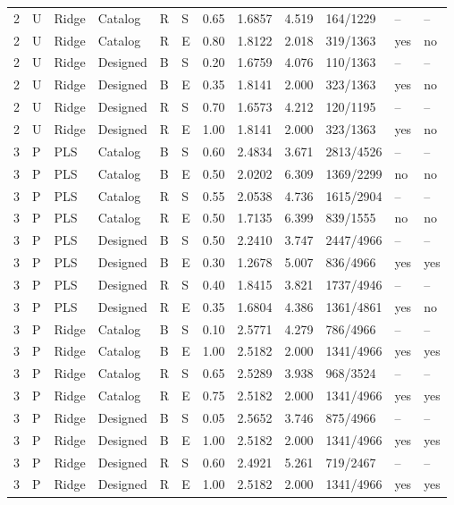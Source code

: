\documentclass[10pt,a4paper]{article}
\begin{document}
\begin{landscape}
\begin{longtable}{rlllllrrrlll}
2 & U & Ridge & Catalog & R & S & 0.65 & 1.6857 & 4.519 & 164/1229 & -- & -- \\
2 & U & Ridge & Catalog & R & E & 0.80 & 1.8122 & 2.018 & 319/1363 & yes & no \\
2 & U & Ridge & Designed & B & S & 0.20 & 1.6759 & 4.076 & 110/1363 & -- & -- \\
2 & U & Ridge & Designed & B & E & 0.35 & 1.8141 & 2.000 & 323/1363 & yes & no \\
2 & U & Ridge & Designed & R & S & 0.70 & 1.6573 & 4.212 & 120/1195 & -- & -- \\
2 & U & Ridge & Designed & R & E & 1.00 & 1.8141 & 2.000 & 323/1363 & yes & no \\
3 & P & PLS & Catalog & B & S & 0.60 & 2.4834 & 3.671 & 2813/4526 & -- & -- \\
3 & P & PLS & Catalog & B & E & 0.50 & 2.0202 & 6.309 & 1369/2299 & no & no \\
3 & P & PLS & Catalog & R & S & 0.55 & 2.0538 & 4.736 & 1615/2904 & -- & -- \\
3 & P & PLS & Catalog & R & E & 0.50 & 1.7135 & 6.399 & 839/1555 & no & no \\
3 & P & PLS & Designed & B & S & 0.50 & 2.2410 & 3.747 & 2447/4966 & -- & -- \\
3 & P & PLS & Designed & B & E & 0.30 & 1.2678 & 5.007 & 836/4966 & yes & yes \\
3 & P & PLS & Designed & R & S & 0.40 & 1.8415 & 3.821 & 1737/4946 & -- & -- \\
3 & P & PLS & Designed & R & E & 0.35 & 1.6804 & 4.386 & 1361/4861 & yes & no \\
3 & P & Ridge & Catalog & B & S & 0.10 & 2.5771 & 4.279 & 786/4966 & -- & -- \\
3 & P & Ridge & Catalog & B & E & 1.00 & 2.5182 & 2.000 & 1341/4966 & yes & yes \\
3 & P & Ridge & Catalog & R & S & 0.65 & 2.5289 & 3.938 & 968/3524 & -- & -- \\
3 & P & Ridge & Catalog & R & E & 0.75 & 2.5182 & 2.000 & 1341/4966 & yes & yes \\
3 & P & Ridge & Designed & B & S & 0.05 & 2.5652 & 3.746 & 875/4966 & -- & -- \\
3 & P & Ridge & Designed & B & E & 1.00 & 2.5182 & 2.000 & 1341/4966 & yes & yes \\
3 & P & Ridge & Designed & R & S & 0.60 & 2.4921 & 5.261 & 719/2467 & -- & -- \\
3 & P & Ridge & Designed & R & E & 1.00 & 2.5182 & 2.000 & 1341/4966 & yes & yes \\

\end{longtable}
\end{landscape}
\end{document}
